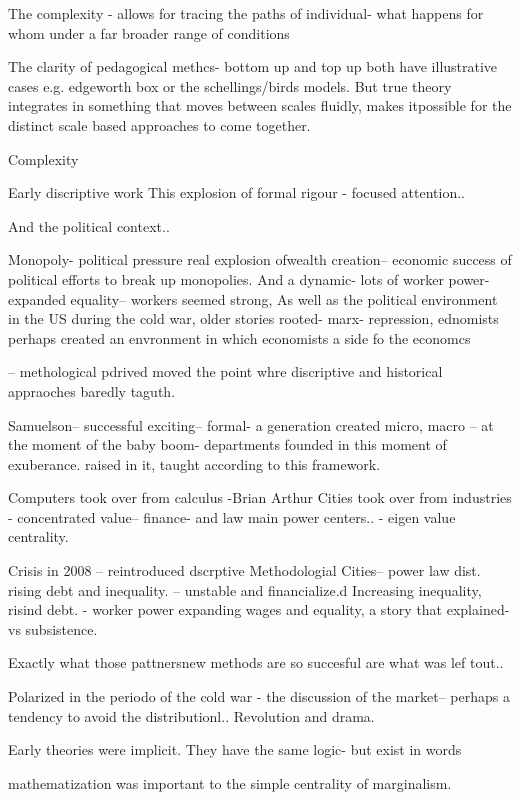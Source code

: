 The complexity - allows for tracing the paths of individual- what happens for whom under a far broader range of conditions

The clarity of pedagogical methcs- bottom up and top up both have illustrative cases e.g. edgeworth box or the schellings/birds models.
But true theory integrates in something that moves between scales fluidly, makes itpossible for the distinct scale based approaches to come together.


Complexity

Early discriptive work
This explosion of formal rigour - focused attention.. 


And the political context..

Monopoly- political pressure real explosion ofwealth creation-- economic success of political efforts to break up monopolies.
And a dynamic- lots of worker power- expanded equality-- workers seemed strong, 
As well as the political environment in the US during the cold war, older stories rooted- marx- repression, ednomists perhaps created an envronment in which economists
a side fo the economcs

-- methological pdrived moved the point whre discriptive and historical appraoches baredly taguth.

Samuelson-- successful exciting-- formal-
a generation
created micro, macro
-- at the moment of the baby boom- departments founded in this moment of exuberance. raised in it, taught according to this framework.


Computers took over from calculus -Brian Arthur
Cities took over from industries - concentrated value-- finance- and law main power centers.. - eigen value centrality.

Crisis in 2008 -- reintroduced dscrptive
Methodologial
Cities-- power law dist. rising debt and inequality. -- unstable and financialize.d
Increasing inequality, risind debt. - worker power expanding wages and equality, a story that explained- vs subsistence.


Exactly what those pattnersnew methods are so succesful are what was lef tout..



Polarized in the periodo of the cold war - the discussion of the market-- perhaps a tendency to avoid the distributionl.. Revolution and drama.



Early theories were implicit. They have the same logic- but exist in words

mathematization was important to the simple centrality of marginalism.







